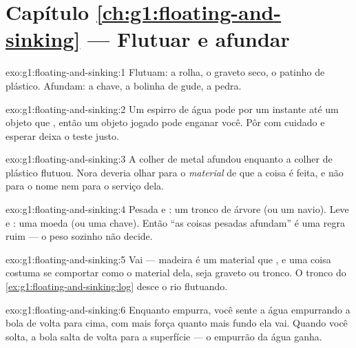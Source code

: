 \section*{Capítulo \ref{ch:g1:floating-and-sinking} --- Flutuar e afundar}

\begin{solution}{exo:g1:floating-and-sinking:1}
Flutuam: a rolha, o graveto seco, o patinho de plástico. Afundam: a
chave, a bolinha de gude, a pedra.
\end{solution}

\begin{solution}{exo:g1:floating-and-sinking:2}
Um espirro de água pode  por um instante até um objeto que
, então um objeto jogado pode enganar você. Pôr com cuidado e
esperar deixa o teste justo.
\end{solution}

\begin{solution}{exo:g1:floating-and-sinking:3}
A colher de metal afundou enquanto a colher de plástico flutuou. Nora
deveria olhar para o \emph{material} de que a coisa é feita, e não
para o nome nem para o serviço dela.
\end{solution}

\begin{solution}{exo:g1:floating-and-sinking:4}
Pesada e : um tronco de árvore (ou um navio). Leve e :
uma moeda (ou uma chave). Então ``as coisas pesadas afundam'' é uma
regra ruim --- o peso sozinho não decide.
\end{solution}

\begin{solution}{exo:g1:floating-and-sinking:5}
Vai --- madeira é um material que , e uma coisa costuma se
comportar como o material dela, seja graveto ou tronco. O tronco do
\cref{ex:g1:floating-and-sinking:log} desce o rio flutuando.
\end{solution}

\begin{solution}{exo:g1:floating-and-sinking:6}
Enquanto empurra, você sente a água empurrando a bola de volta para
cima, com mais força quanto mais fundo ela vai. Quando você solta, a
bola salta de volta para a superfície --- o empurrão da água ganha.
\end{solution}

